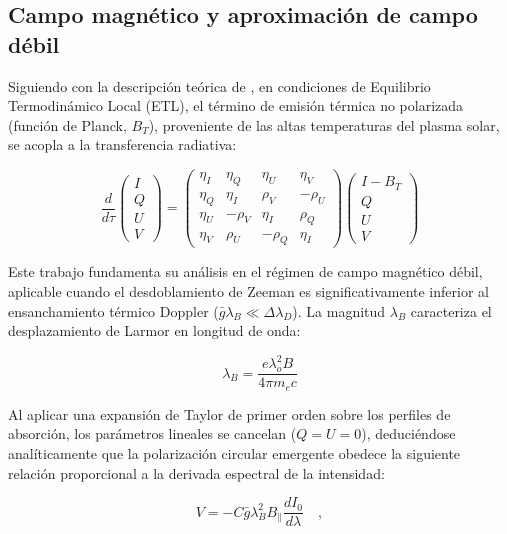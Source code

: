 \subsection{Campo magnético y aproximación de campo débil}
Siguiendo con la descripción teórica de \cite{sanchezSolarObservationsTechniques1992}, en condiciones de Equilibrio Termodinámico Local (ETL), el término de emisión térmica no polarizada (función de Planck, $B_T$), proveniente de las altas temperaturas del plasma solar, se acopla a la transferencia radiativa:

\begin{equation}
    \label{eq:fuenteRadiacion}
    \frac{d}{d\tau} \begin{pmatrix} I \\ Q \\ U \\ V \end{pmatrix} = \begin{pmatrix} \eta_I & \eta_Q & \eta_U & \eta_V \\ \eta_Q & \eta_I & \rho_V & -\rho_U \\ \eta_U & -\rho_V & \eta_I & \rho_Q \\ \eta_V & \rho_U & -\rho_Q & \eta_I \end{pmatrix} \begin{pmatrix} I - B_T \\ Q \\ U \\ V \end{pmatrix}
\end{equation}

Este trabajo fundamenta su análisis en el régimen de campo magnético débil, aplicable cuando el desdoblamiento de Zeeman es significativamente inferior al ensanchamiento térmico Doppler ($\bar{g} \lambda_B \ll \Delta \lambda_D$). La magnitud $\lambda_B$ caracteriza el desplazamiento de Larmor en longitud de onda:

\begin{equation}
    \label{eq:lambdaB}
    \lambda_B = \frac{e \lambda_o^2 B}{4 \pi m_e c}
\end{equation}

Al aplicar una expansión de Taylor de primer orden sobre los perfiles de absorción, los parámetros lineales se cancelan ($Q=U=0$), deduciéndose analíticamente que la polarización circular emergente obedece la siguiente relación proporcional a la derivada espectral de la intensidad:

\begin{equation}
    \label{eq:campoDebil}
    V = -C \bar{g} \lambda_B^2 B_{\parallel} \frac{d I_0}{d \lambda} \quad,
\end{equation}

